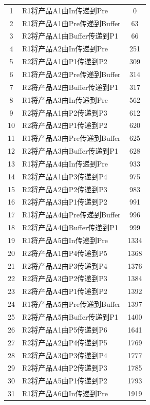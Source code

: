 \documentclass{ctexart}
\begin{document}
{{\begin{longtable}{clc}
        1 & R1将产品A1由In传递到Pre & 0 \\
        2 & R1将产品A1由Pre传递到Buffer & 63 \\
        3 & R2将产品A1由Buffer传递到P1 & 66 \\
        4 & R1将产品A2由In传递到Pre & 251 \\
        5 & R2将产品A1由P1传递到P2 & 309 \\
        6 & R1将产品A2由Pre传递到Buffer & 314 \\
        7 & R2将产品A2由Buffer传递到P1 & 317 \\
        8 & R1将产品A3由In传递到Pre & 562 \\
        9 & R2将产品A1由P2传递到P3 & 612 \\
        10 & R2将产品A2由P1传递到P2 & 620 \\
        11 & R1将产品A3由Pre传递到Buffer & 625 \\
        12 & R2将产品A3由Buffer传递到P1 & 628 \\
        13 & R1将产品A4由In传递到Pre & 933 \\
        14 & R2将产品A1由P3传递到P4 & 975 \\
        15 & R2将产品A2由P2传递到P3 & 983 \\
        16 & R2将产品A3由P1传递到P2 & 991 \\
        17 & R1将产品A4由Pre传递到Buffer & 996 \\
        18 & R2将产品A4由Buffer传递到P1 & 999 \\
        19 & R1将产品A5由In传递到Pre & 1334 \\
        20 & R2将产品A1由P4传递到P5 & 1368 \\
        21 & R2将产品A2由P3传递到P4 & 1376 \\
        22 & R2将产品A3由P2传递到P3 & 1384 \\
        23 & R2将产品A4由P1传递到P2 & 1392 \\
        24 & R1将产品A5由Pre传递到Buffer & 1397 \\
        25 & R2将产品A5由Buffer传递到P1 & 1400 \\
        26 & R2将产品A1由P5传递到P6 & 1641 \\
        27 & R2将产品A2由P4传递到P5 & 1769 \\
        28 & R2将产品A3由P3传递到P4 & 1777 \\
        29 & R2将产品A4由P2传递到P3 & 1785 \\
        30 & R2将产品A5由P1传递到P2 & 1793 \\
        31 & R1将产品A6由In传递到Pre & 1919 \\

\end{longtable}}}
\end{document}
